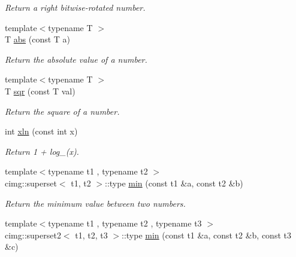 \begin{DoxyCompactItemize}
\begin{DoxyCompactList}\small\item\em Return a right bitwise-\/rotated number. \item\end{DoxyCompactList}\item 
{\footnotesize template$<$typename T $>$ }\\T \hyperlink{namespacecimg__library_1_1cimg_a5dd0a4d361e2db646f5042be6bfe1d31}{abs} (const T a)
\begin{DoxyCompactList}\small\item\em Return the absolute value of a number. \item\end{DoxyCompactList}\item 
\hypertarget{namespacecimg__library_1_1cimg_a415ccb3d8d3cf2e7bbdca6fa18ed3465}{
{\footnotesize template$<$typename T $>$ }\\T \hyperlink{namespacecimg__library_1_1cimg_a415ccb3d8d3cf2e7bbdca6fa18ed3465}{sqr} (const T val)}
\label{namespacecimg__library_1_1cimg_a415ccb3d8d3cf2e7bbdca6fa18ed3465}

\begin{DoxyCompactList}\small\item\em Return the square of a number. \item\end{DoxyCompactList}\item 
\hypertarget{namespacecimg__library_1_1cimg_a8dde183be46c1821a3901b63825a4cf4}{
int \hyperlink{namespacecimg__library_1_1cimg_a8dde183be46c1821a3901b63825a4cf4}{xln} (const int x)}
\label{namespacecimg__library_1_1cimg_a8dde183be46c1821a3901b63825a4cf4}

\begin{DoxyCompactList}\small\item\em Return 1 + log\_(x). \item\end{DoxyCompactList}\item 
\hypertarget{namespacecimg__library_1_1cimg_a0659abebd7019433a254dd8d934ed32c}{
{\footnotesize template$<$typename t1 , typename t2 $>$ }\\cimg::superset$<$ t1, t2 $>$::type \hyperlink{namespacecimg__library_1_1cimg_a0659abebd7019433a254dd8d934ed32c}{min} (const t1 \&a, const t2 \&b)}
\label{namespacecimg__library_1_1cimg_a0659abebd7019433a254dd8d934ed32c}

\begin{DoxyCompactList}\small\item\em Return the minimum value between two numbers. \item\end{DoxyCompactList}\item 
\hypertarget{namespacecimg__library_1_1cimg_a65e023d29962d5b7239540affa01c934}{
{\footnotesize template$<$typename t1 , typename t2 , typename t3 $>$ }\\cimg::superset2$<$ t1, t2, t3 $>$::type \hyperlink{namespacecimg__library_1_1cimg_a65e023d29962d5b7239540affa01c934}{min} (const t1 \&a, const t2 \&b, const t3 \&c)}
\label{namespacecimg__library_1_1cimg_a65e023d29962d5b7239540affa01c934}


\end{DoxyCompactItemize}
